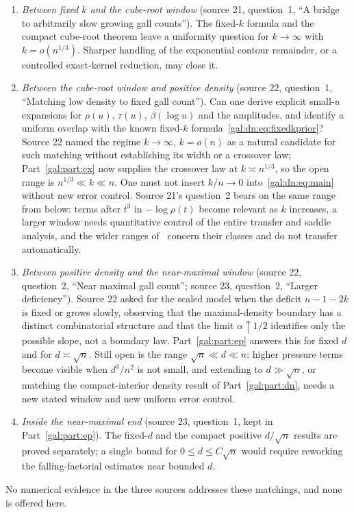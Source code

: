 \documentclass[11pt,letterpaper]{article}
\numberwithin{equation}{section}
\theoremstyle{definition}\newtheorem{definition}[theorem]{Definition}
\theoremstyle{remark}\newtheorem{remark}[theorem]{Remark}
\begin{document}
\begin{enumerate}[label=(\alph*),leftmargin=*,itemsep=4pt]
\item \emph{Between fixed $k$ and the cube-root window} (source 21, question~1, ``A bridge to arbitrarily slow growing gall counts''). The fixed-$k$ formula and the compact cube-root theorem leave a uniformity question for $k\to\infty$ with $k=o(n^{1/3})$. Sharper handling of the exponential contour remainder, or a controlled exact-kernel reduction, may close it.
\item \emph{Between the cube-root window and positive density} (source 22, question~1, ``Matching low density to fixed gall count''). Can one derive explicit small-$u$ expansions for $\rho(u)$, $\tau(u)$, $\beta(\log u)$ and the amplitudes, and identify a uniform overlap with the known fixed-$k$ formula~\eqref{gal:dn:eq:fixedkprior}? Source 22 named the regime $k\to\infty$, $k=o(n)$ as a natural candidate for such matching without establishing its width or a crossover law; Part~\ref{gal:part:cx} now supplies the crossover law at $k\asymp n^{1/3}$, so the open range is $n^{1/3}\ll k\ll n$. One must not insert $k/n\to0$ into~\eqref{gal:dn:eq:main} without new error control. Source 21's question~2 bears on the same range from below: terms after $t^3$ in $-\log\rho(t)$ become relevant as $k$ increases, a larger window needs quantitative control of the entire transfer and saddle analysis, and the wider ranges of~\cite{fuchs-yu} concern their classes and do not transfer automatically.
\item \emph{Between positive density and the near-maximal window} (source 22, question~2, ``Near maximal gall count''; source 23, question~2, ``Larger deficiency''). Source 22 asked for the scaled model when the deficit $n-1-2k$ is fixed or grows slowly, observing that the maximal-density boundary has a distinct combinatorial structure and that the limit $\alpha\uparrow1/2$ identifies only the possible slope, not a boundary law. Part~\ref{gal:part:ep} answers this for fixed $d$ and for $d\asymp\sqrt n$. Still open is the range $\sqrt n\ll d\ll n$: higher pressure terms become visible when $d^3/n^2$ is not small, and extending to $d\gg\sqrt n$, or matching the compact-interior density result of Part~\ref{gal:part:dn}, needs a new stated window and new uniform error control.
\item \emph{Inside the near-maximal end} (source 23, question~1, kept in Part~\ref{gal:part:ep}). The fixed-$d$ and the compact positive $d/\sqrt n$ results are proved separately; a single bound for $0\le d\le C\sqrt n$ would require reworking the falling-factorial estimates near bounded $d$.
\end{enumerate}
No numerical evidence in the three sources addresses these matchings, and none is offered here.
\end{document}
